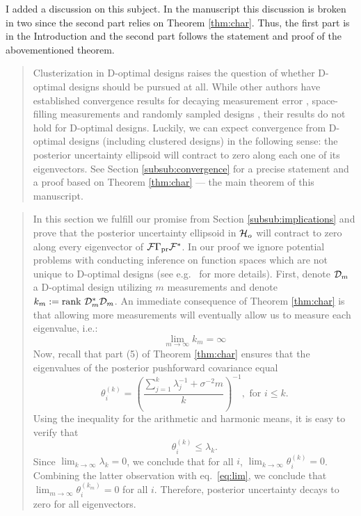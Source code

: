 \AR I added a discussion on this subject. In the manuscript this
discussion is broken in two since the second part relies on Theorem
\ref{thm:char}. Thus, the first part is in the Introduction and the
second part follows the statement and proof of the abovementioned
theorem.
\begin{quote}%
  Clusterization in D-optimal designs raises the question of whether
  D-optimal designs should be pursued at all. While other authors have
  established convergence results for decaying measurement error
  \cite{knapik2011}, space-filling measurements \cite{teckentrup2020}
  and randomly sampled designs \cite{nickl2023}, their results do not
  hold for D-optimal designs. Luckily, we can expect convergence from
  D-optimal designs (including clustered designs) in the following
  sense: the posterior uncertainty ellipsoid will contract to zero
  along each one of its eigenvectors. See Section
  \ref{subsub:convergence} for a precise statement and a proof based
  on Theorem \ref{thm:char} --- the main theorem of this manuscript.
\end{quote}
\begin{quote}
  In this section we fulfill our promise from Section
  \ref{subsub:implications} and prove that the posterior uncertainty
  ellipsoid in $\mathcal{H}_o$ will contract to zero along every eigenvector
  of $\mathcal{F} \Gamma_{\textup{pr}} \mathcal{F}^*$. In our proof we ignore potential problems
  with conducting inference on function spaces which are not unique to
  D-optimal designs (see e.g.~\cite{owhadi2015} for more details).
  \newline
  \newline  
  First, denote $\mathcal{D}_m$ a D-optimal design utilizing $m$ measurements
  and denote $k_m := \textup{rank}\ \mathcal{D}_m^*\mathcal{D}_m$. An immediate consequence of
  Theorem \ref{thm:char} is that allowing more measurements will
  eventually allow us to measure each eigenvalue, i.e.:
  \begin{equation}\label{eq:lim}
    \lim_{m\to\infty} k_m = \infty
  \end{equation}
  \newline
  \newline
  Now, recall that part (5) of Theorem \ref{thm:char} ensures that the
eigenvalues of the posterior pushforward covariance equal
\begin{equation*}
  \theta^{(k)}_i = \left ( \frac{\sum_{j=1}^{k} \lambda_j^{-1} +
    \sigma^{-2}m}{k} \right )^{-1}, \text{ for $i\leq k$}.
\end{equation*}
Using the inequality for the arithmetic and harmonic means, it is easy
to verify that
\begin{equation*}
  \theta^{(k)}_i \leq \lambda_{k}.
\end{equation*}
Since $\lim_{k\to \infty} \lambda_k= 0$, we conclude that for all $i$,
$\lim_{k\to\infty} \theta^{(k)}_i = 0$. Combining the latter
observation with eq.~\eqref{eq:lim}, we conclude that
$\lim_{m\to\infty} \theta^{(k_m)}_i = 0$ for all $i$. Therefore,
posterior uncertainty decays to zero for all eigenvectors.
\end{quote}




